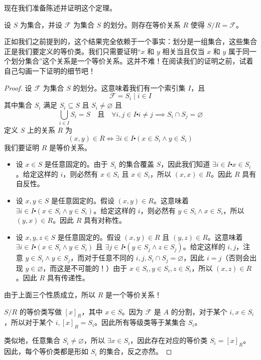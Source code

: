现在我们准备陈述并证明这个定理。

\begin{theorem}
    设 $S$ 为集合，并设 $\mathcal{F}$ 为集合 $S$ 的划分。则存在等价关系 $R$ 使得 $S/R=\mathcal{F}$。
\end{theorem}

正如我们之前提到的，这个结果完全依赖于一个事实：划分是一组集合，这些集合正是我们要定义的等价类。我们只需要证明``$x$ 和 $y$ 相关当且仅当 $x$ 和 $y$ 属于同一个划分集合''这个关系是一个等价关系。这并不难！在阅读我们的证明之前，试着自己勾画一下证明的细节吧！

\begin{proof}
    设 $\mathcal{F}$ 为集合 $S$ 的划分。这意味着我们有一个索引集 $I$，且
    \[\mathcal{F} = {S_i \mid i \in I}\]
    其中集合 $S_i$ 满足 $S_i \subseteq S$ 且 $S_i \ne \varnothing$ 且
    \[\bigcup_{i \in I} S_i = S \quad \text{且} \quad \forall i, j \in I \centerdot i \ne j \implies S_i \cap S_j = \varnothing\]
    定义 $S$ 上的关系 $R$ 为
    \[(x, y) \in R \iff \exists i \in I \centerdot (x \in S_i \land y \in S_i)\]
    我们要证明 $R$ 是等价关系。

    \begin{itemize}
        \item 设 $x \in S$ 是任意固定的。由于 $S_i$ 的集合覆盖 $S$，因此我们知道 $\exists i \in I \centerdot x \in S_i$。给定这样的 $i$，则必然有 $x \in S_i$ 且 $x \in S_i$，所以 $(x,x) \in R$。因此 $R$ 具有自反性。
        \item 设 $x, y \in S$ 是任意固定的。假设 $(x, y) \in R$。这意味着 $\exists i \in I \centerdot (x \in S_i \land y \in S_i)$。给定这样的 $i$，则必然有 $y \in S_i \land x \in S_i$，所以 $(y,x) \in R$。因此 $R$ 具有对称性。
        \item 设 $x, y, z \in S$ 是任意固定的。假设 $(x, y) \in R$ 且 $(y, z) \in R$。这意味着 $\exists i \in I \centerdot (x \in S_i \land y \in S_i)$ 且 $\exists j \in I \centerdot (y \in S_j \land z \in S_j)$。给定这样的 $i,j$，注意 $y \in S_i \land y \in S_j$，而对于任意不同的 $i,j, S_i \cap S_j = \varnothing$，因此 $i=j$（否则会出现 $y \in \varnothing$，而这是不可能的！）由于 $x \in S_i, y \in S_i, z \in S_i$，所以 $(x,z) \in R$。因此 $R$ 具有传递性。
    \end{itemize}
    由于上面三个性质成立，所以 $R$ 是一个等价关系！

    $S/R$ 的等价类写做 $[x]_R$，其中 $x \in S$。因为 $\mathcal{F}$ 是 $A$ 的分割，对于某个 $i, x \in S_i$，所以对于某个 $i, [x]_R = S_i$。因此所有等级类等于某集合 $S_i$。

    类似地，任意集合 $S_i \ne \varnothing$，所以 $\exists x \in S_i$，因此存在对应的等价类 $S_i=[x]_R$。因此，每个等价类都是形如 $S_i$ 的集合，反之亦然。
\end{proof}

